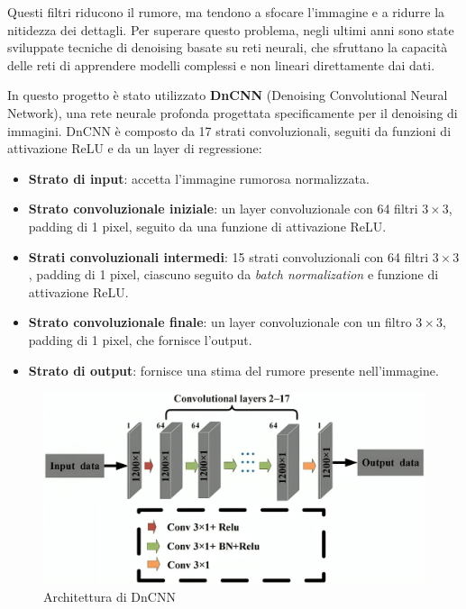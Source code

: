 Questi filtri riducono il rumore, ma tendono a sfocare l'immagine e a ridurre la nitidezza dei dettagli. Per superare questo problema, negli ultimi anni sono state sviluppate tecniche di denoising basate su reti neurali, che sfruttano la capacità delle reti di apprendere modelli complessi e non lineari direttamente dai dati.

In questo progetto è stato utilizzato \textbf{DnCNN} (Denoising Convolutional Neural Network), una rete neurale profonda progettata specificamente per il denoising di immagini. DnCNN è composto da 17 strati convoluzionali, seguiti da funzioni di attivazione ReLU e da un layer di regressione:

\begin{itemize}
    \item \textbf{Strato di input}: accetta l'immagine rumorosa normalizzata.
    \item \textbf{Strato convoluzionale iniziale}: un layer convoluzionale con 64 filtri $3 \times 3$, padding di 1 pixel, seguito da una funzione di attivazione ReLU. \item \textbf{Strati convoluzionali intermedi}: 15 strati convoluzionali con 64 filtri $3 \times 3$, padding di 1 pixel, ciascuno seguito da \textit{batch normalization} e funzione di attivazione ReLU. \item \textbf{Strato convoluzionale finale}: un layer convoluzionale con un filtro $3 \times 3$, padding di 1 pixel, che fornisce l'output. 
    \item \textbf{Strato di output}: fornisce una stima del rumore presente nell'immagine.
\end{itemize}

\begin{figure}[H]
    \centering
    \includegraphics[scale=0.3]{../assets/dncnn.png}
    \captionsetup{justification=centering}
    \caption{Architettura di DnCNN \cite{dncnn_img}} \label{fig:dncnn_arch}
\end{figure}

